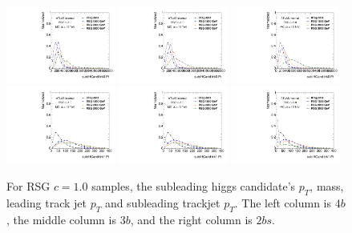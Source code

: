 \begin{figure}[htbp!]
\begin{center}
\includegraphics[width=0.32\textwidth,angle=-90]{figures/boosted/Truth/Moriond_comp_0_FourTag_Signal_sublHCand_trk0_Pt.pdf}
\includegraphics[width=0.32\textwidth,angle=-90]{figures/boosted/Truth/Moriond_comp_0_ThreeTag_Signal_sublHCand_trk0_Pt.pdf}
\includegraphics[width=0.32\textwidth,angle=-90]{figures/boosted/Truth/Moriond_comp_0_TwoTag_split_Signal_sublHCand_trk0_Pt.pdf}\\
\includegraphics[width=0.32\textwidth,angle=-90]{figures/boosted/Truth/Moriond_comp_0_FourTag_Signal_sublHCand_trk1_Pt.pdf}
\includegraphics[width=0.32\textwidth,angle=-90]{figures/boosted/Truth/Moriond_comp_0_ThreeTag_Signal_sublHCand_trk1_Pt.pdf}
\includegraphics[width=0.32\textwidth,angle=-90]{figures/boosted/Truth/Moriond_comp_0_TwoTag_split_Signal_sublHCand_trk1_Pt.pdf}\\
\caption{For RSG $c=1.0$ samples, the subleading higgs candidate's $p_T$, mass, leading track jet $p_T$ and subleading trackjet $p_T$. The left column is $4b$, the middle column is $3b$, and the right column is $2bs$.}
\label{fig:app-signal-sublHCand}
\end{center}
\end{figure}
